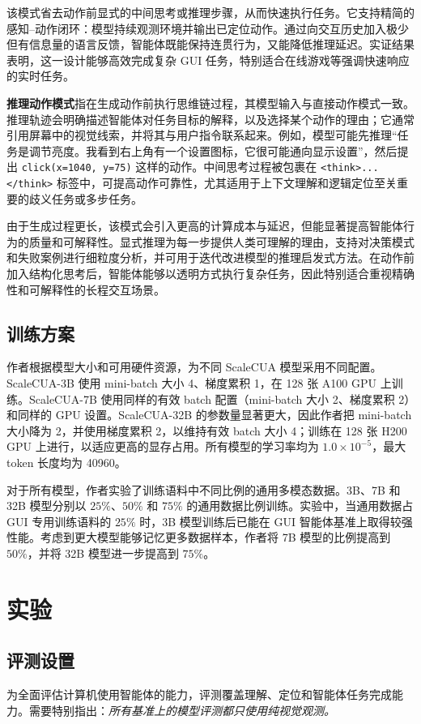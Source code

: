 \documentclass[10pt,twocolumn]{article}
\begin{document}
该模式省去动作前显式的中间思考或推理步骤，从而快速执行任务。它支持精简的感知--动作闭环：模型持续观测环境并输出已定位动作。通过向交互历史加入极少但有信息量的语言反馈，智能体既能保持连贯行为，又能降低推理延迟。实证结果表明，这一设计能够高效完成复杂 GUI 任务，特别适合在线游戏等强调快速响应的实时任务。

\textbf{推理动作模式}指在生成动作前执行思维链过程，其模型输入与直接动作模式一致。推理轨迹会明确描述智能体对任务目标的解释，以及选择某个动作的理由；它通常引用屏幕中的视觉线索，并将其与用户指令联系起来。例如，模型可能先推理“任务是调节亮度。我看到右上角有一个设置图标，它很可能通向显示设置”，然后提出 \texttt{click(x=1040, y=75)} 这样的动作。中间思考过程被包裹在 \texttt{<think>...</think>} 标签中，可提高动作可靠性，尤其适用于上下文理解和逻辑定位至关重要的歧义任务或多步任务。

由于生成过程更长，该模式会引入更高的计算成本与延迟，但能显著提高智能体行为的质量和可解释性。显式推理为每一步提供人类可理解的理由，支持对决策模式和失败案例进行细粒度分析，并可用于迭代改进模型的推理启发式方法。在动作前加入结构化思考后，智能体能够以透明方式执行复杂任务，因此特别适合重视精确性和可解释性的长程交互场景。

\subsection{训练方案}
作者根据模型大小和可用硬件资源，为不同 ScaleCUA 模型采用不同配置。ScaleCUA-3B 使用 mini-batch 大小 4、梯度累积 1，在 128 张 A100 GPU 上训练。ScaleCUA-7B 使用同样的有效 batch 配置（mini-batch 大小 2、梯度累积 2）和同样的 GPU 设置。ScaleCUA-32B 的参数量显著更大，因此作者把 mini-batch 大小降为 2，并使用梯度累积 2，以维持有效 batch 大小 4；训练在 128 张 H200 GPU 上进行，以适应更高的显存占用。所有模型的学习率均为 $1.0\times10^{-5}$，最大 token 长度均为 40960。

对于所有模型，作者实验了训练语料中不同比例的通用多模态数据。3B、7B 和 32B 模型分别以 $25\%$、$50\%$ 和 $75\%$ 的通用数据比例训练。实验中，当通用数据占 GUI 专用训练语料的 $25\%$ 时，3B 模型训练后已能在 GUI 智能体基准上取得较强性能。考虑到更大模型能够记忆更多数据样本，作者将 7B 模型的比例提高到 $50\%$，并将 32B 模型进一步提高到 $75\%$。

\section{实验}
\label{sec:exp}

\subsection{评测设置}

为全面评估计算机使用智能体的能力，评测覆盖理解、定位和智能体任务完成能力。需要特别指出：\emph{所有基准上的模型评测都只使用纯视觉观测。}
\end{document}

